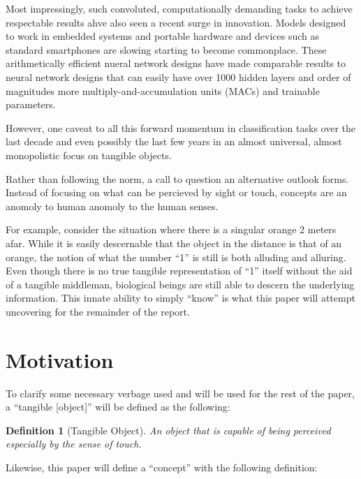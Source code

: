 \documentclass[conference]{IEEEtran}
\newtheorem{definition}{Definition}
\begin{document}
Most impressingly, such convoluted, computationally demanding tasks to achieve
respectable results ahve also seen a recent surge in innovation. Models designed
to work in embedded systems and portable hardware and devices such as standard
smartphones are slowing starting to become commonplace. These arithmetically
efficient nueral network designs have made comparable results to neural network
designs that can easily have over 1000 hidden layers and order of magnitudes
more multiply-and-accumulation units (MACs) and trainable parameters.


However, one caveat to all this forward momentum in classification tasks over
the last decade and even possibly the last few years in an almost universal,
almost monopolistic focus on tangible objects.


Rather than following the norm, a call to question an alternative outlook forms.
Instead of focusing on what can be percieved by sight or touch, concepts are an
anomoly to human anomoly to the human senses.

For example, consider the situation where there is a singular orange 2 meters
afar. While it is easily descernable that the object in the distance is that of
an orange, the notion of what the number ``1'' is still is both alluding and
alluring. Even though there is no true tangible representation of ``1'' itself
without the aid of a tangible middleman, biological beings are still able to
descern the underlying information. This innate ability to simply ``know'' is
what this paper will attempt uncovering for the remainder of the report.





\section{Motivation} %

To clarify some necessary verbage used and will be used for the rest of the
paper, a ``tangible [object]'' will be defined as the following:

\begin{definition}[Tangible Object]

    An object that is capable of being perceived especially by the sense of
    touch.

\end{definition}

Likewise, this paper will define a ``concept'' with the following definition:
\end{document}
